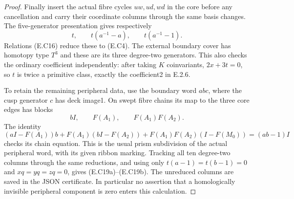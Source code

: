 \begin{proof}
Finally insert the actual fibre cycles $uw,ud,wd$ in
the core before any cancellation and carry their
coordinate columns through the same basis changes.
The five-generator presentation gives respectively
\[
 t,\qquad t(a^{-1}-a),\qquad t(a^{-1}-1).
 \tag{E.C18}
\]
Relations (E.C16) reduce these to (E.C4). The external
boundary cover has homotopy type $T^3$ and these are
its three degree-two generators. This also checks
the ordinary coefficient independently: after taking
$K$ coinvariants, $2x+3t=0$, so $t$ is twice a
primitive class, exactly the coefficient2 in E.2.6.

To retain the remaining peripheral data, use the
boundary word $abc$, where the cusp generator $c$
has deck image1. On swept fibre chains its map to
the three core edges has blocks
\[
                 bI,\qquad F(A_1),\qquad F(A_1)F(A_2).
 \tag{E.C21}
\]
The identity
\[
 (aI-F(A_1))b+F(A_1)(bI-F(A_2))
       +F(A_1)F(A_2)(I-F(M_0))=(ab-1)I
\]
checks its chain equation. This is the usual prism
subdivision of the actual peripheral word, with
its given ribbon marking. Tracking all ten
degree-two columns through the same reductions,
and using only $t(a-1)=t(b-1)=0$ and
$xq=yq=zq=0$, gives (E.C19a)--(E.C19b).
The unreduced columns are saved in the JSON
certificate. In particular no assertion that a
homologically invisible peripheral component is
zero enters this calculation.
\end{proof}
